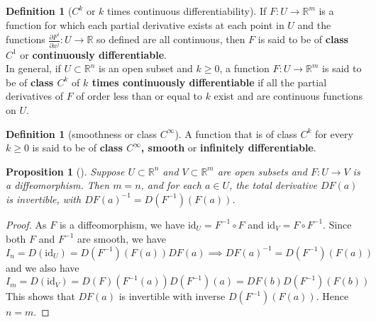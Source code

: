 \documentclass[reqno]{amsart}
\theoremstyle{plain}%
\newtheorem{proposition}[theorem]{Proposition}
\theoremstyle{definition}
\newtheorem{definition}[theorem]{Definition}
\theoremstyle{remark}
\newcommand{\id}{{\mathrm{id}}}
\begin{document}
        \begin{definition}[$C^{k}$ or $k$ times continuous differentiability]
        If $F  \colon U \to \mathbb{R}^{m}$ is a function for which each partial
        derivative exists at each point in $U$ and the functions
        $\frac{\partial F^{i}}{\partial x^{j}}  \colon U \to \mathbb{R}$ so defined
        are all continuous, then $F$ is said to be of
        \textbf{class $C^{1}$} or \textbf{continuously differentiable}.\\
        In general, if $U \subset \mathbb{R}^{n}$ is an open subset and $k \ge 0$,
        a function $F  \colon U \to \mathbb{R}^{m}$ is said to be of \textbf{class
        $C^{k}$} of \textbf{$k$ times continuously differentiable} if all the
        partial derivatives of $F$ of order less than or equal to $k$ exist and are
        continuous functions on $U$.
        \end{definition}

        \begin{definition}[smoothness or class $C^{\infty}$]
        A function that is of class $C^{k}$ for every $k \ge 0$ is said to be of
        \textbf{class $C^{\infty}$, smooth} or \textbf{infinitely differentiable}.
        \end{definition}

        \begin{proposition}[]\label{diffeo-derivative-invertible}
        Suppose $U \subset \mathbb{R}^{n}$ and $V \subset \mathbb{R}^{m}$ are open
        subsets and $F  \colon U \to V$ is a diffeomorphism. Then
        $m = n$, and for each $a \in U$, the total derivative $DF (a)$ is
        invertible, with $DF(a)^{-1} = D\left( F^{-1} \right) \left( 
        F(a) \right) $.
        \end{proposition}

        \begin{proof}
        As $F$ is a diffeomorphism, we have
        $\id_{U} = F^{-1} \circ F$ and
        $\id_{V} = F \circ F^{-1}$. Since both $F$ and $F^{-1}$ are smooth, we have
        \[
            I_n = D\left( \id_{U} \right) 
            = D \left( F^{-1} \right) \left( F(a) \right) 
            DF(a) \implies DF(a)^{-1} = D\left( F^{-1} \right) \left( F (a) \right) 
        \] 
        and we also have
        \[
        I_{m} = D \left( \id_V \right) 
        = D \left( F \right) \left( F^{-1}(a) \right) D \left( F^{-1} \right) (a)
        = DF (b) D\left( F^{-1} \right) \left( F(b) \right) 
        \] 
        This shows that
        $DF(a)$ is invertible with inverse
        $D\left( F^{-1} \right) \left( F(a) \right) $. Hence $n = m$.
        \end{proof}
\end{document}

